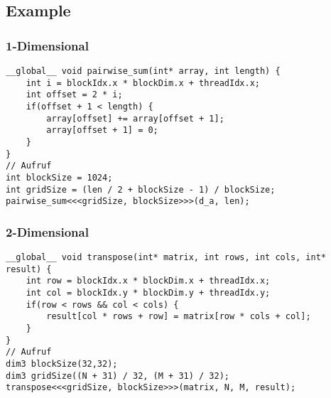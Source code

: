 \subsection{Example}
\subsubsection{1-Dimensional}
\begin{lstlisting}
__global__ void pairwise_sum(int* array, int length) {
    int i = blockIdx.x * blockDim.x + threadIdx.x;
    int offset = 2 * i;
    if(offset + 1 < length) {
        array[offset] += array[offset + 1];
        array[offset + 1] = 0;
    }
}
// Aufruf
int blockSize = 1024;
int gridSize = (len / 2 + blockSize - 1) / blockSize;
pairwise_sum<<<gridSize, blockSize>>>(d_a, len);
\end{lstlisting}

\subsubsection{2-Dimensional}
\begin{lstlisting}
__global__ void transpose(int* matrix, int rows, int cols, int* result) {
    int row = blockIdx.x * blockDim.x + threadIdx.x;
    int col = blockIdx.y * blockDim.y + threadIdx.y;
    if(row < rows && col < cols) {
        result[col * rows + row] = matrix[row * cols + col];
    }
}
// Aufruf
dim3 blockSize(32,32);
dim3 gridSize((N + 31) / 32, (M + 31) / 32);
transpose<<<gridSize, blockSize>>>(matrix, N, M, result);
\end{lstlisting}